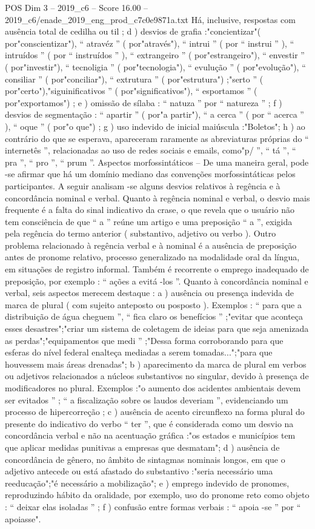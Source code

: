 \begin{textsample}{POS Dim 3 – 2019\_c6 – Score 16.00 – 2019\_c6/enade\_2019\_eng\_prod\_c7c0e9871a.txt}
Há, inclusive, respostas com ausência total de cedilha ou til ; d ) desvios de grafia :"concientizar"( por"conscientizar"), “ atravéz ” ( por"através"), “ intrui ” ( por “ instrui ” ), “ intruídos ” ( por “ instruídos ” ), “ extrangeiro ” ( por"estrangeiro"), “ envestir ” ( por"investir"), “ tecnoligia ” ( por"tecnologia"), “ evulução ” ( por"evolução"), “ consiliar ” ( por"conciliar"), “ extrutura ” ( por"estrutura") ;"serto ” ( por"certo"),"siguinificativos ” ( por"significativos"), “ esportamos ” ( por"exportamos") ; e ) omissão de sílaba : “ natuza ” por “ natureza ” ; f ) desvios de segmentação : “ apartir ” ( por"a partir"), “ a cerca ” ( por “ acerca ” ), “ oque ” ( por"o que") ; g ) uso indevido de inicial maiúscula :"Boletos"; h ) ao contrário do que se esperava, apareceram raramente as abreviaturas próprias do “ internetês ”, relacionadas ao uso de redes sociais e emails, como"p/ ”, “ tá ”, “ pra ”, “ pro ”, “ prum ”.
Aspectos morfossintáticos – De uma maneira geral, pode -se afirmar que há um domínio mediano das convenções morfossintáticas pelos participantes.
A seguir analisam -se alguns desvios relativos à regência e à concordância nominal e verbal.
Quanto à regência nominal e verbal, o desvio mais frequente é a falta do sinal indicativo da crase, o que revela que o usuário não tem consciência de que “ a ” reúne um artigo e uma preposição “ a ”, exigida pela regência do termo anterior ( substantivo, adjetivo ou verbo ).
Outro problema relacionado à regência verbal e à nominal é a ausência de preposição antes de pronome relativo, processo generalizado na modalidade oral da língua, em situações de registro informal.
Também é recorrente o emprego inadequado de preposição, por exemplo : “ ações a evitá -los ”.
Quanto à concordância nominal e verbal, seis aspectos merecem destaque : a ) ausência ou presença indevida de marca de plural ( com sujeito anteposto ou posposto ).
Exemplos : “ para que a distribuição de água cheguem ”, “ fica claro os benefícios ” ;"evitar que aconteça esses desastres";"criar um sistema de coletagem de ideias para que seja amenizada as perdas";"equipamentos que medi ” ;"Dessa forma corroborando para que esferas do nível federal enalteça mediadas a serem tomadas...";"para que houvessem mais áreas drenadas"; b ) aparecimento da marca de plural em verbos ou adjetivos relacionados a núcleos substantivos no singular, devido à presença de modificadores no plural.
Exemplos :"o aumento dos acidentes ambientais devem ser evitados ” ; “ a fiscalização sobre os laudos deveriam ”, evidenciando um processo de hipercorreção ; c ) ausência de acento circunflexo na forma plural do presente do indicativo do verbo “ ter ”, que é considerada como um desvio na concordância verbal e não na acentuação gráfica :"os estados e municípios tem que aplicar medidas punitivas a empresas que desmatam"; d ) ausência de concordância de gênero, no âmbito de sintagmas nominais longos, em que o adjetivo antecede ou está afastado do substantivo :"seria necessário uma reeducação";"é necessário a mobilização"; e ) emprego indevido de pronomes, reproduzindo hábito da oralidade, por exemplo, uso do pronome reto como objeto : “ deixar elas isoladas ” ; f ) confusão entre formas verbais : “ apoia -se ” por “ apoiasse".

\end{textsample}
